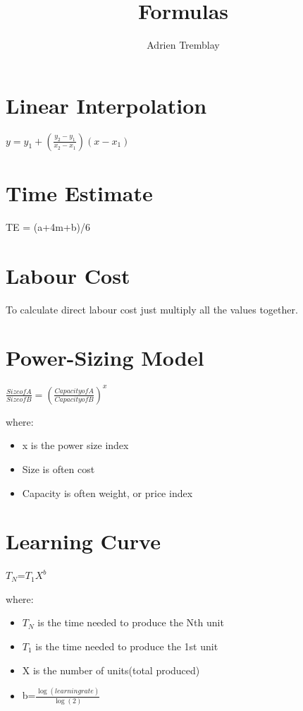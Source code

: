 \documentclass[]{article}
\title{Formulas}
\author{Adrien Tremblay}
\date{}
\providecommand{\tightlist}{%
  \setlength{\itemsep}{0pt}\setlength{\parskip}{0pt}}
\begin{document}
\maketitle

\hypertarget{linear-interpolation}{%
\section{Linear Interpolation}\label{linear-interpolation}}

\(y=y_{1} + (\frac{y_{2}-y_{1}}{x_{2}-x_{1}})(x-x_{1})\)

\hypertarget{time-estimate}{%
\section{Time Estimate}\label{time-estimate}}

TE = (a+4m+b)/6

\hypertarget{labour-cost}{%
\section{Labour Cost}\label{labour-cost}}

To calculate direct labour cost just multiply all the values together.

\hypertarget{power-sizing-model}{%
\section{Power-Sizing Model}\label{power-sizing-model}}

\(\frac{Size of A}{Size of B}=(\frac{Capacity of A}{Capacity of B})^{x}\)

where:

\begin{itemize}
\tightlist
\item
  x is the power size index
\item
  Size is often cost
\item
  Capacity is often weight, or price index
\end{itemize}

\hypertarget{learning-curve}{%
\section{Learning Curve}\label{learning-curve}}

\(T_{N}\)=\(T_{1}\)\(X^{b}\)

where:

\begin{itemize}
\tightlist
\item
  \(T_{N}\) is the time needed to produce the Nth unit
\item
  \(T_{1}\) is the time needed to produce the 1st unit
\item
  X is the number of units(total produced)
\item
  b=\(\frac{\log(learning rate)}{\log(2)}\)
\end{itemize}
\end{document}
